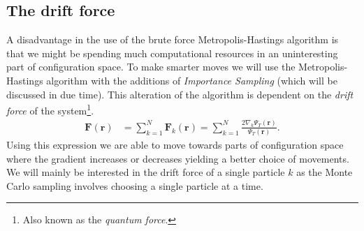 \documentclass[
    a4paper, aps, twocolumn, floatfix, superscriptaddress,
    nofootinbib]{revtex4-1}
\newcommand{\vf}{\mathbf}
\newcommand{\1}{\mathds{1}}
\begin{document}
    \subsection{The drift force}
        A disadvantage in the use of the brute force Metropolis-Hastings
        algorithm is that we might be spending much computational resources in
        an uninteresting part of configuration space. To make smarter moves we
        will use the Metropolis-Hastings algorithm with the additions of
        \emph{Importance Sampling}  (which will be discussed in due time). This
        alteration of the algorithm is dependent on the \emph{drift force} of
        the system\footnote{Also known as the \emph{quantum force}.}.
        \begin{align}
            \vf{F}(\vf{r})
            &=
            \sum_{k = 1}^N
            \vf{F}_k(\vf{r})
            =
            \sum_{k = 1}^N
            \frac{2\nabla_k\Psi_T(\vf{r})}{\Psi_T(\vf{r})}.
            \label{eq:drift_force}
        \end{align}
        Using this expression we are able to move towards parts of
        configuration space where the gradient increases or decreases yielding a
        better choice of movements. We will mainly be interested in the drift
        force of a single particle $k$ as the Monte Carlo sampling involves
        choosing a single particle at a time.
\end{document}

